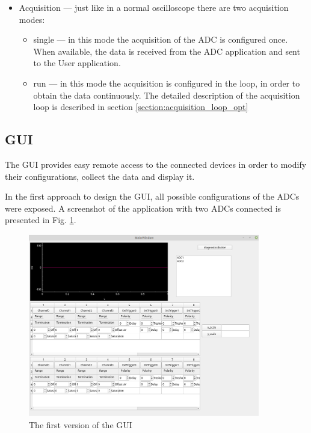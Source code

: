 \begin{itemize}
                \item Acquisition --- just like in a normal oscilloscope there are two acquisition modes:
                \begin{itemize}
                    \item single --- in this mode the acquisition of the ADC is configured once. When available, the data is received from the ADC application and sent to the User application. 
                    \item run --- in this mode the acquisition is configured in the loop, in order to obtain the data continuously. The detailed description of the acquisition loop is described in section \ref{section:acquisition_loop_opt}
                \end{itemize}
            \end{itemize}
            
    \subsection{GUI} \label{section:do_gui_app}
        The GUI provides easy remote access to the connected devices in order to modify their configurations, collect the data and display it. 
        
        In the first approach to design the GUI, all possible configurations of the ADCs were exposed. A screenshot of the application with two ADCs connected is presented in Fig. \ref{fig:gui_first_approach}.

        \begin{figure}
        	\centerline{\includegraphics[width=0.9\textwidth]{figures/GUI_first_approach.jpg}}
        	\caption{The first version of the GUI}
        	\label{fig:gui_first_approach}
        \end{figure}
        
